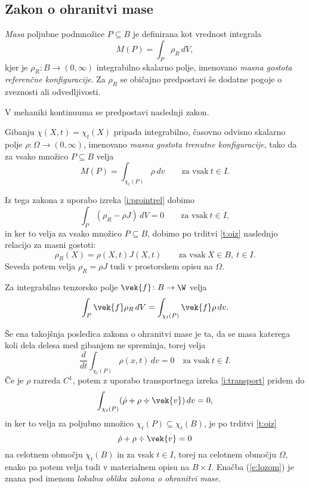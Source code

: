 \subsection{Zakon o ohranitvi mase}


\emph{Masa} poljubne podmnožice $P\subseteq B$ je definirana kot vrednost integrala
\[ M(P)=\int_P\rho_R\,dV, \]
kjer je $\rho_R\colon B\to(0,\infty)$ integrabilno skalarno polje, imenovano
\emph{masna gostota referenčne konfiguracije}.
Za $\rho_R$ se običajno predpostavi še dodatne pogoje o zveznosti ali odvedljivosti.

\begin{comment}
Poljubni konfiguraciji materialnega telesa $\kappa\colon B\to\E$ pripada
integrabilno skalarno polje $\rho_{\kappa}\colon B\to(0,\infty)$, imenovano
\emph{masna gostota konfiguracije $\kappa$}, tako da za vsako množico $P\subseteq B$ velja
\[ M(P)=\int_{\kappa(P)}\rho_{\kappa}\,dv. \]
\end{comment}

V mehaniki kontinuuma se predpostavi naslednji zakon.
\begin{aksiom}
	Gibanju $\chi(X,t)=\chi_t(X)$ pripada integrabilno, časovno odvisno skalarno polje
	$\rho\colon\Omega\to(0,\infty)$, imenovano \emph{masna gostota trenutne konfiguracije},
	tako da za vsako množico $P\subseteq B$ velja
	\[ M(P)=\int_{\chi_t(P)}\rho\,dv\qquad\textrm{za vsak}\ t\in I. \]
\end{aksiom}

Iz tega zakona z uporabo izreka \ref{i:prointrel} dobimo
\[ \int_{P}(\rho_R-\rho J)\,dV=0 \qquad\textrm{za vsak}\ t\in I, \]
in ker to velja za vsako množico $P\subseteq B$, dobimo po trditvi \ref{t:oiz}
naslednjo relacijo za masni gostoti:
\begin{equation} \label{e:rojror}
	\rho_R(X)=\rho(X,t)J(X,t)\qquad\textrm{za vsak}\ X\in B,\ t\in I.
\end{equation}
Seveda potem velja $\rho_R=\rho J$ tudi v prostorskem opisu na $\Omega$.

\begin{posledica} \label{p:roji}
	Za integrabilno tenzorsko polje $\vek{f}\colon B\to\W$ velja
	\[
		\int_{P}\vek{f}\rho_R\,dV=\int_{\chi_t(P)}\vek{f}\rho\,dv.
	\]
\end{posledica}

Še ena takojšnja posledica zakona o ohranitvi mase je ta, da se masa katerega koli
dela delesa med gibanjem ne spreminja, torej velja
\[ \frac{d}{dt}\int_{\chi_t(P)}\rho(x,t)\,dv = 0\quad\textrm{za vsak}\ t\in I. \]
Če je $\rho$ razreda $C^1$, potem z uporabo transportnega izreka \ref{i:transport}
pridem do
\[ \int_{\chi_t(P)}(\dot{\rho}+\rho\div\vek{v})\,dv=0, \]
in ker to velja za poljubno množico $\chi_t(P)\subseteq\chi_t(B)$, je po trditvi \ref{t:oiz}
\begin{equation} \label{e:lozom}
	\dot{\rho}+\rho\div\vek{v}=0
\end{equation}
na celotnem območju $\chi_t(B)$ in za vsak $t\in I$, torej na celotnem območju $\Omega$,
enako pa potem velja tudi v materialnem opisu na $B\times I$.
Enačba (\ref{e:lozom}) je znana pod imenom \emph{lokalna oblika zakona o ohranitvi mase}.

